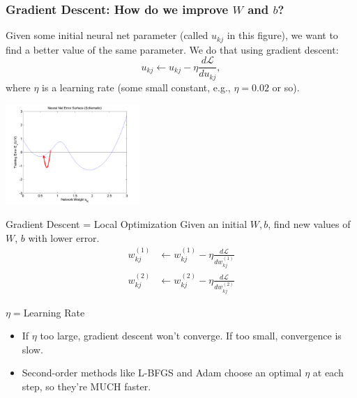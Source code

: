 \documentclass{beamer}
\begin{document}
\begin{frame}
  \frametitle{Gradient Descent: How do we improve $W$ and $b$?}  Given
  some initial neural net parameter (called $u_{kj}$ in this figure),
  we want to find a better value of the same parameter.  We do that
  using gradient descent:
  \[
  u_{kj} \leftarrow u_{kj}-\eta\frac{d{\mathcal L}}{du_{kj}},
  \]
  where $\eta$ is a learning rate (some small constant, e.g., $\eta=0.02$ or so).
  \centerline{\includegraphics[width=2in]{figs/nn_errorsurf1.png}}
\end{frame}

\begin{frame}
\begin{block}{Gradient Descent = Local Optimization}
  Given an initial $W,b$, find new values of $W$, $b$ with lower error.
  \begin{align*}
    w_{kj}^{(1)} &\leftarrow w_{kj}^{(1)}-\eta\frac{d{\mathcal L}}{d w_{kj}^{(1)}}\\
    w_{kj}^{(2)} &\leftarrow w_{kj}^{(2)}-\eta\frac{d{\mathcal L}}{d w_{kj}^{(2)}}
  \end{align*}
\end{block}
\begin{block}{$\eta=$Learning Rate}
    \begin{itemize}
      \item If $\eta$ too large, gradient descent won't converge. If
        too small, convergence is slow.
      \item Second-order methods like L-BFGS and Adam choose an optimal $\eta$
        at each step, so they're MUCH faster.
    \end{itemize}
\end{block}
\end{frame}
\end{document}
